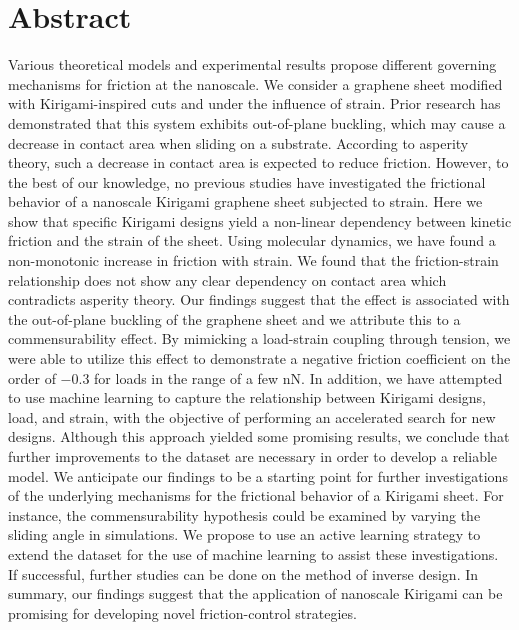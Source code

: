 \chapter*{Abstract} 
Various theoretical models and experimental results propose different governing
mechanisms for friction at the nanoscale. We consider a graphene sheet modified
with Kirigami-inspired cuts and under the influence of strain. Prior research
has demonstrated that this system exhibits out-of-plane buckling, which may cause a decrease in contact area when sliding on a substrate. According to
asperity theory, such a decrease in contact area is expected to reduce friction. However, to the best of our knowledge, no previous
studies have investigated the frictional behavior of a nanoscale Kirigami graphene
sheet subjected to strain. Here we show that specific Kirigami designs yield a
non-linear dependency between kinetic friction and the strain of the sheet.
Using molecular dynamics, we have found a non-monotonic increase in
friction with strain. We found that the friction-strain relationship does not
show any clear dependency on contact area which contradicts asperity theory. Our
findings suggest that the effect is associated with the out-of-plane buckling of
the graphene sheet and we attribute this to a commensurability effect. By
mimicking a load-strain coupling through tension, we were able to utilize this
effect to demonstrate a negative friction coefficient on the order of $-0.3$ for
loads in the range of a few nN. In addition, we have attempted to use machine
learning to capture the relationship between Kirigami designs, load, and strain,
with the objective of performing an accelerated search for new designs. Although this approach yielded some promising results, we conclude that further
improvements to the dataset are necessary in order to develop a reliable model. We anticipate our findings to be a starting point for further investigations of
the underlying mechanisms for the frictional behavior of a Kirigami sheet. For
instance, the commensurability hypothesis could be examined by varying the
sliding angle in simulations. We propose to use an active learning strategy to
extend the dataset for the use of machine learning to assist these
investigations. If successful, further studies can be done on the method of
inverse design. In summary, our findings suggest that the application of
nanoscale Kirigami can be promising for developing novel friction-control
strategies.

